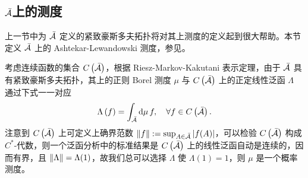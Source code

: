 		\subsection{\texorpdfstring{$\bar{\mathcal{A}}$上的测度}{量子位型空间上的测度}}

			上一节中为 $\bar{\mathcal{A}}$ 定义的紧致豪斯多夫拓扑将对其上测度的定义起到很大帮助。本节定义 $\bar{\mathcal{A}}$ 上的 Ashtekar-Lewandowski 测度，参见\cite{Ashtekar1994,Thiemann0210094,Thiemann2007}。

			考虑连续函数的集合 $C\left(\bar{\mathcal{A}}\right)$，根据 Riesz-Markov-Kakutani 表示定理，由于 $\bar{\mathcal{A}}$ 具有紧致豪斯多夫拓扑，其上的正则 Borel 测度 $\mu$ 与 $C\left(\bar{\mathcal{A}}\right)$ 上的正定线性泛函 $\Lambda$ 通过下式一一对应
			\begin{equation}
				\Lambda\left(f\right) = \int_{\bar{\configurationspace{A}}} \dd{\mu} f \qc \forall f \in C\left(\bar{\configurationspace{A}}\right).
			\end{equation}
			注意到 $C\left(\bar{\mathcal{A}}\right)$ 上可定义上确界范数 $\norm{f} := \sup_{A \in \bar{\mathcal{A}}} \abs{f(A)}$，可以检验 $C\left(\bar{\mathcal{A}}\right)$ 构成 $C^*$-代数，则一个泛函分析中的标准结果是 $C\left(\bar{\mathcal{A}}\right)$ 上的线性泛函自动是连续的，因而有界，且 $\norm{\Lambda} = \Lambda(1)$，故我们总可以选择 $\Lambda$ 使 $\Lambda(1)=1$，则 $\mu$ 是一个概率测度。

